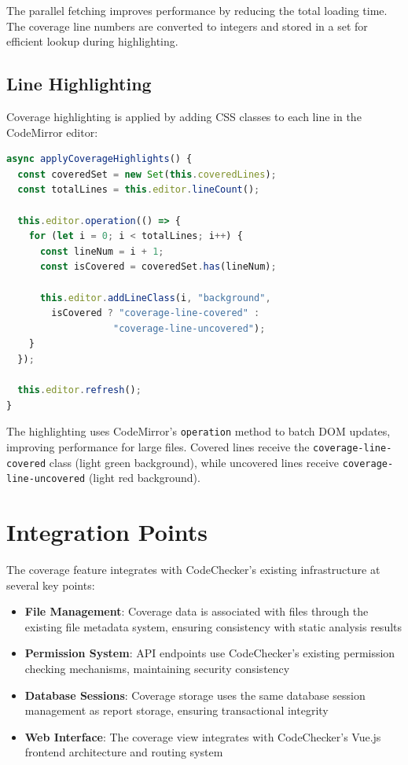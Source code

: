 The parallel fetching improves performance by reducing the total loading time. The coverage line numbers are converted to integers and stored in a set for efficient lookup during highlighting.

\subsection{Line Highlighting}

Coverage highlighting is applied by adding CSS classes to each line in the CodeMirror editor:

\begin{lstlisting}[language=JavaScript, caption={Applying coverage highlights}]
async applyCoverageHighlights() {
  const coveredSet = new Set(this.coveredLines);
  const totalLines = this.editor.lineCount();
  
  this.editor.operation(() => {
    for (let i = 0; i < totalLines; i++) {
      const lineNum = i + 1;
      const isCovered = coveredSet.has(lineNum);
      
      this.editor.addLineClass(i, "background",
        isCovered ? "coverage-line-covered" : 
                   "coverage-line-uncovered");
    }
  });
  
  this.editor.refresh();
}
\end{lstlisting}

The highlighting uses CodeMirror's \texttt{operation} method to batch DOM updates, improving performance for large files. Covered lines receive the \texttt{coverage-line-covered} class (light green background), while uncovered lines receive \texttt{coverage-line-uncovered} (light red background).

\section{Integration Points}

The coverage feature integrates with CodeChecker's existing infrastructure at several key points:

\begin{itemize}
    \item \textbf{File Management}: Coverage data is associated with files through the existing file metadata system, ensuring consistency with static analysis results
    \item \textbf{Permission System}: API endpoints use CodeChecker's existing permission checking mechanisms, maintaining security consistency
    \item \textbf{Database Sessions}: Coverage storage uses the same database session management as report storage, ensuring transactional integrity
    \item \textbf{Web Interface}: The coverage view integrates with CodeChecker's Vue.js frontend architecture and routing system
\end{itemize}

